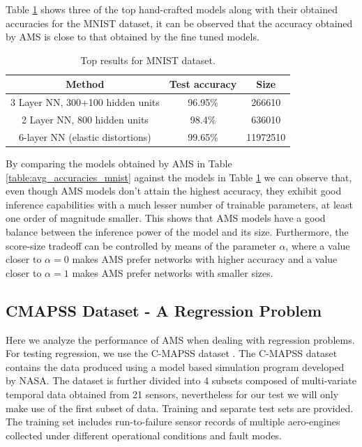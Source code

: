 \documentclass[12pt]{elsart}%
\begin{document}
Table \ref{table:MNIST_results_top} shows three of the top hand-crafted models along with their obtained accuracies for the MNIST dataset, it can be observed that the accuracy obtained by AMS is close to that obtained by the fine tuned models. 

\begin{table}[!htb]
\begin{center}
\caption{Top results for MNIST dataset.}
\label{table:MNIST_results_top}
\vspace{12pt}
\begin{tabular}{| c | c | c |}
\hline
Method & Test accuracy & Size\\
\hline
3 Layer NN, 300+100 hidden units \cite{lecun-98} &  96.95\% & 266610\\
2 Layer NN, 800 hidden units \cite{Simard2003} & 98.4\% & 636010\\
6-layer NN (elastic distortions) \cite{Ciresan2010}  & 99.65\% & 11972510\\
\hline
\end{tabular}
\end{center}
\end{table}

By comparing the models obtained by AMS in Table \ref{table:avg_accuracies_mnist} against the models in Table \ref{table:MNIST_results_top} we can observe that, even though AMS models don't attain the highest accuracy, they exhibit good inference capabilities with a much lesser number of trainable parameters, at least one order of magnitude smaller. This shows that AMS models have a good balance between the inference power of the model and its size. Furthermore, the score-size tradeoff can be controlled by means of the parameter $\alpha$, where a value closer to $\alpha=0$ makes AMS prefer networks with higher accuracy and a value closer to $\alpha = 1$ makes AMS prefer networks with smaller sizes.


\subsection{CMAPSS Dataset - A Regression Problem}

Here we analyze the performance of AMS when dealing with regression problems. For testing regression, we use the C-MAPSS dataset \cite{CMAPS2008}. The C-MAPSS dataset contains the data produced using a model based simulation program developed by NASA. The dataset is further divided into 4 subsets composed of multi-variate temporal data obtained from 21 sensors, nevertheless for our test we will only make use of the first subset of data. Training and separate test sets are provided. The training set includes run-to-failure sensor records of multiple aero-engines collected under different operational conditions and fault modes.
\end{document}
